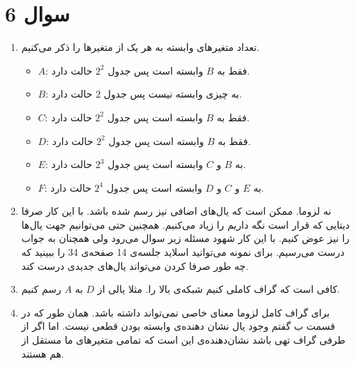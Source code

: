 \section*{سوال 6}
\begin{enumerate}
    \item تعداد متغیر‌های وابسته به هر یک از متغیر‌ها را ذکر می‌کنیم.
    \begin{itemize}
        \item $A$: فقط به $B$ وابسته است پس جدول $2^2$ حالت دارد.
        \item $B$: به چیزی وابسته نیست پس جدول $2$ حالت دارد.
        \item $C$: فقط به $B$ وابسته است پس جدول $2^2$ حالت دارد.
        \item $D$: فقط به $B$ وابسته است پس جدول $2^2$ حالت دارد.
        \item $E$: به $B$ و $C$ وابسته است پس جدول $2^3$ حالت دارد.
        \item $F$: به $E$ و $C$ و $D$ وابسته است پس جدول $2^4$ حالت دارد.
    \end{itemize}
    \item نه لزوما. ممکن است که یال‌های اضافی نیز رسم شده باشد. با این کار صرفا دیتایی که قرار است نگه داریم را زیاد می‌کنیم.
    همچنین حتی می‌توانیم جهت یال‌ها را نیز عوض کنیم. با این کار شهود مسئله زیر سوال می‌رود ولی همچنان به جواب درست می‌رسیم.
    برای نمونه می‌توانید اسلاید جلسه‌ی 14 صفحه‌ی 34 را ببینید که چه طور صرفا
    کردن می‌تواند یال‌های جدیدی درست کند.
    \item کافی است که گراف کاملی کنیم شبکه‌ی بالا را. مثلا یالی از $D$ به $A$ رسم کنیم.
    \item برای گراف کامل لزوما معنای خاصی نمی‌تواند داشته باشد. همان طور که در قسمت ب گفتم وجود یال نشان دهنده‌ی وابسته بودن قطعی نیست.
    اما اگر از طرفی گراف تهی باشد نشان‌دهنده‌ی این است که تمامی متغیر‌های ما مستقل از هم هستند.
\end{enumerate}